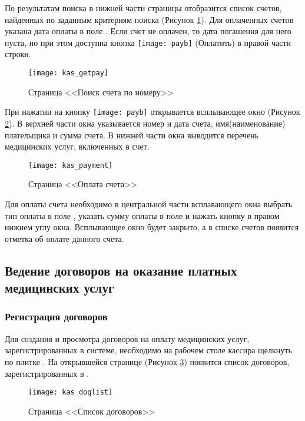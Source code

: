 По результатам поиска в нижней части страницы отобразится список счетов, найденных по заданным критериям поиска (Рисунок \ref{img_kas_getpay}). Для оплаченных счетов указана дата оплаты в поле . Если счет не оплачен, то дата погашения для него пуста, но при этом доступна кнопка \texttt{[image: payb]} (Оплатить) в правой части строки.

\begin{figure}[ht]\centering
	\texttt{[image: kas\_getpay]}
	\caption{Страница <<Поиск счета по номеру>>}
	\label{img_kas_getpay}
\end{figure}

При нажатии на кнопку \texttt{[image: payb]} открывается всплывающее окно (Рисунок \ref{img_kas_payment}). В верхней части окна указывается номер и дата счета, имя(наименование) плательщика и сумма счета. В нижней части окна выводится перечень медицинских услуг, включенных в счет. 

\begin{figure}[ht]\centering
	\texttt{[image: kas\_payment]}
	\caption{Страница <<Оплата счета>>}
	\label{img_kas_payment}
\end{figure}

Для оплаты счета необходимо в центральной части всплавающего окна выбрать тип оплаты в поле , указать сумму оплаты в поле  и нажать кнопку  в правом нижнем углу окна. Всплывающее окно будет закрыто, а в списке счетов появится отметка об оплате данного счета.


\subsection{Ведение договоров на оказание платных медицинских услуг}

\subsubsection{Регистрация договоров}

Для создания и просмотра договоров на оплату медицинских услуг, зарегистрированных в системе, необходимо на рабочем столе кассира щелкнуть по плитке . На открывшейся странице (Рисунок \ref{img_kas_doglist}) появится список договоров, зарегистрированных в \tmisp.

\begin{figure}[ht]\centering
	\texttt{[image: kas\_doglist]}
	\caption{Страница <<Список договоров>>}
	\label{img_kas_doglist}
\end{figure}

